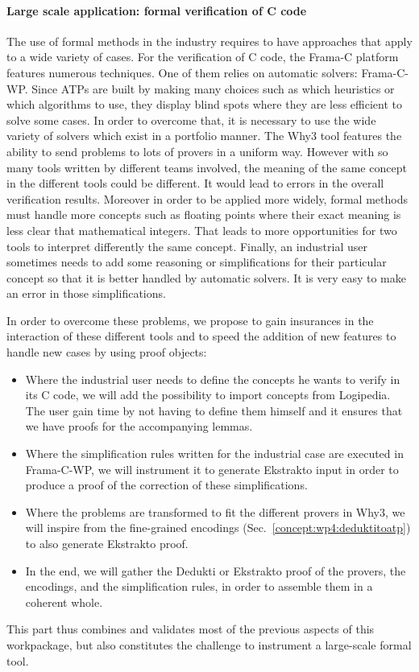 \paragraph{Large scale application: formal verification of C code}

The use of formal methods in the industry requires to have approaches
that apply to a wide variety of cases. For the verification of C code,
the Frama-C platform features numerous techniques. One of them relies on
automatic solvers: Frama-C-WP. Since ATPs are built by making many
choices such as which heuristics or which algorithms to use, they
display blind spots where they are less efficient to solve some cases.
In order to overcome that, it is necessary to use the wide variety of
solvers which exist in a portfolio manner. The Why3 tool features the
ability to send problems to lots of provers in a uniform way. However
with so many tools written by different teams involved, the meaning of
the same concept in the different tools could be different. It would
lead to errors in the overall verification results. Moreover in order to
be applied more widely, formal methods must handle more concepts such as
floating points where their exact meaning is less clear that
mathematical integers. That leads to more opportunities for two tools to
interpret differently the same concept. Finally, an industrial user
sometimes needs to add some reasoning or simplifications for their
particular concept so that it is better handled by automatic solvers. It
is very easy to make an error in those simplifications.

In order to overcome these problems, we propose to gain insurances in
the interaction of these different tools and to speed the addition of
new features to handle new cases by using proof objects:
\begin{itemize}
\item Where the industrial user needs to define the concepts he wants to
  verify in its C code, we will add the possibility to import concepts
  from Logipedia. The user gain time by not having to define them
  himself and it ensures that we have proofs for the accompanying
  lemmas.
\item Where the simplification rules written for the industrial case are
  executed in Frama-C-WP, we will instrument it to generate Ekstrakto
  input in order to produce a proof of the correction of these
  simplifications.
\item Where the problems are transformed to fit the different provers in
  Why3, we will inspire from the fine-grained encodings
  (Sec.~\ref{concept:wp4:deduktitoatp}) to also generate Ekstrakto
  proof.
\item In the end, we will gather the Dedukti or Ekstrakto proof of the
  provers, the encodings, and the simplification rules, in order to
  assemble them in a coherent whole.
\end{itemize}
This part thus combines and validates most of the previous aspects of
this workpackage, but also constitutes the challenge to instrument a
large-scale formal tool.


